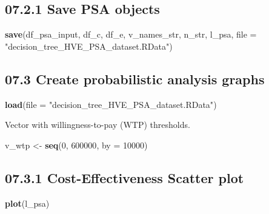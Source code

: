 \documentclass[
]{article}
\newenvironment{Shaded}{\begin{snugshade}}{\end{snugshade}}
\newcommand{\DataTypeTok}[1]{\textcolor[rgb]{0.13,0.29,0.53}{#1}}
\newcommand{\DecValTok}[1]{\textcolor[rgb]{0.00,0.00,0.81}{#1}}
\newcommand{\KeywordTok}[1]{\textcolor[rgb]{0.13,0.29,0.53}{\textbf{#1}}}
\newcommand{\NormalTok}[1]{#1}
\newcommand{\StringTok}[1]{\textcolor[rgb]{0.31,0.60,0.02}{#1}}
\begin{document}
\hypertarget{save-psa-objects}{%
\subsection{07.2.1 Save PSA objects}\label{save-psa-objects}}

\begin{Shaded}
\begin{Highlighting}[]
\KeywordTok{save}\NormalTok{(df_psa_input, df_c, df_e, v_names_str, n_str,}
\NormalTok{     l_psa,}
     \DataTypeTok{file =} \StringTok{"decision_tree_HVE_PSA_dataset.RData"}\NormalTok{)}
\end{Highlighting}
\end{Shaded}

\hypertarget{create-probabilistic-analysis-graphs}{%
\subsection{07.3 Create probabilistic analysis
graphs}\label{create-probabilistic-analysis-graphs}}

\begin{Shaded}
\begin{Highlighting}[]
\KeywordTok{load}\NormalTok{(}\DataTypeTok{file =} \StringTok{"decision_tree_HVE_PSA_dataset.RData"}\NormalTok{)}
\end{Highlighting}
\end{Shaded}

Vector with willingness-to-pay (WTP) thresholds.

\begin{Shaded}
\begin{Highlighting}[]
\NormalTok{v_wtp <-}\StringTok{ }\KeywordTok{seq}\NormalTok{(}\DecValTok{0}\NormalTok{, }\DecValTok{600000}\NormalTok{, }\DataTypeTok{by =} \DecValTok{10000}\NormalTok{)}
\end{Highlighting}
\end{Shaded}

\hypertarget{cost-effectiveness-scatter-plot}{%
\subsection{07.3.1 Cost-Effectiveness Scatter
plot}\label{cost-effectiveness-scatter-plot}}

\begin{Shaded}
\begin{Highlighting}[]
\KeywordTok{plot}\NormalTok{(l_psa)}
\end{Highlighting}
\end{Shaded}
\end{document}
